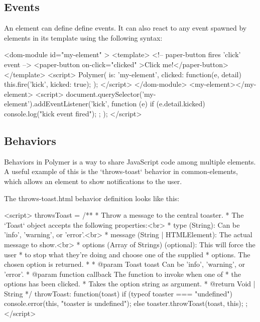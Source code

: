 \subsection{Events}
An element can define define events. It can also react to any event spawned by
elements in its template using the following syntax:

\begin{pyglist}[language=html,numbers=left,numbersep=5pt,fontsize=\small]
<dom-module id="my-element" >
  <template>
    <!-- paper-button fires 'click' event -->
    <paper-button on-click="clicked" >Click me!</paper-button>
  </template>
  <script>
    Polymer({
      is: 'my-element',
      clicked: function(e, detail) {
        this.fire('kick', {kicked: true});
      }
    });
  </script>
</dom-module>
<my-element></my-element>
<script>
  document.querySelector('my-element').addEventListener('kick', function (e) {
    if (e.detail.kicked) {
      console.log("kick event fired");
    };
  });
</script>
\end{pyglist}

\subsection{Behaviors}
Behaviors in Polymer is a way to share JavaScript code among multiple elements.
A useful example of this is the `throws-toast` behavior in common-elements,
which allows an element to show notifications to the user.

The throws-toast.html behavior definition looks like this:
\begin{pyglist}[language=html,numbers=left,numbersep=5pt,fontsize=\small]
<script>
throwsToast = {
  /**
   * Throw a message to the central toaster.
   * The `Toast` object accepts the following properties:<br>
   * type (String): Can be 'info', 'warning', or 'error'.<br>
   * message (String | HTMLElement): The actual message to show.<br>
   * options (Array of Strings) (optional): This will force the user
   * to stop what they're doing and choose one of the supplied
   * options. The chosen option is returned.
   *
   * @param {Toast} toast Can be 'info', 'warning', or 'error'.
   * @param {function} callback The function to invoke when one of
   * the options has been clicked.
   * Takes the option string as argument.
   * @return {Void | String}
   */
  throwToast: function(toast) {
    if (typeof toaster === "undefined") {
      console.error(this, "toaster is undefined");
    } else {
      toaster.throwToast(toast, this);
    }
  }
};
</script>
\end{pyglist}

